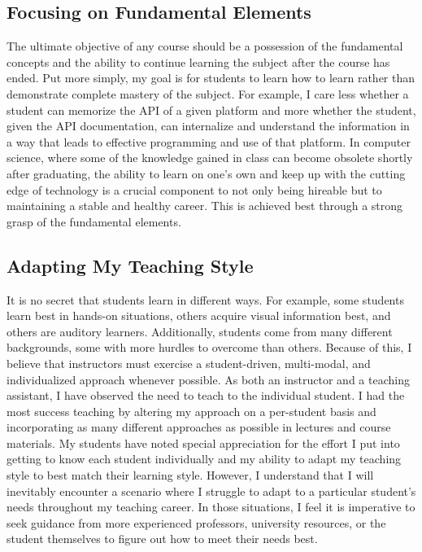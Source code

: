 \subsection*{Focusing on Fundamental Elements}
\vspace{-0.5cm}
The ultimate objective of any course should be a possession of the fundamental concepts and the ability to continue learning the subject after the course has ended. Put more simply, my goal is for students to learn how to learn rather than demonstrate complete mastery of the subject. For example, I care less whether a student can memorize the API of a given platform and more whether the student, given the API documentation, can internalize and understand the information in a way that leads to effective programming and use of that platform. In computer science, where some of the knowledge gained in class can become obsolete shortly after graduating, the ability to learn on one's own and keep up with the cutting edge of technology is a crucial component to not only being hireable but to maintaining a stable and healthy career. This is achieved best through a strong grasp of the fundamental elements.

\subsection*{Adapting My Teaching Style}
\vspace{-0.5cm}
It is no secret that students learn in different ways. For example, some students learn best in hands-on situations, others acquire visual information best, and others are auditory learners. Additionally, students come from many different backgrounds, some with more hurdles to overcome than others. Because of this, I believe that instructors must exercise a student-driven, multi-modal, and individualized approach whenever possible. As both an instructor and a teaching assistant, I have observed the need to teach to the individual student. I had the most success teaching by altering my approach on a per-student basis and incorporating as many different approaches as possible in lectures and course materials. My students have noted special appreciation for the effort I put into getting to know each student individually and my ability to adapt my teaching style to best match their learning style. However, I understand that I will inevitably encounter a scenario where I struggle to adapt to a particular student's needs throughout my teaching career. In those situations, I feel it is imperative to seek guidance from more experienced professors, university resources, or the student themselves to figure out how to meet their needs best.


